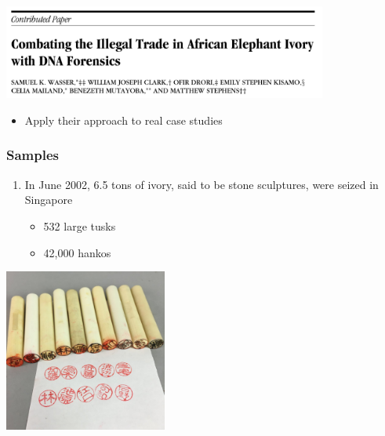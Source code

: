 \documentclass[10pt]{beamer}
\begin{document}
\begin{frame}[t]
\vspace{0.5cm}
	
	\includegraphics[width=0.8\textwidth]{figures/wasser2.png}
	
	\vspace{0.5cm}
	
	\begin{itemize}
		\item Apply their approach to real case studies
	\end{itemize}
\end{frame}


\begin{frame}[t]
\frametitle{Samples}
\vspace{0.5cm}
	
	\begin{enumerate}
		\item In June 2002, 6.5 tons of ivory, said to be stone sculptures, were seized in Singapore
		\medskip
			\begin{itemize}
				\item 532 large tusks
				\medskip
				\item 42,000 hankos
			\end{itemize}
	\end{enumerate}
	
	\vspace{0.5cm}
	
	\begin{center}
		\includegraphics[width=0.4\textwidth]{figures/hankos.jpg}
	\end{center}
\end{frame}
\end{document}
